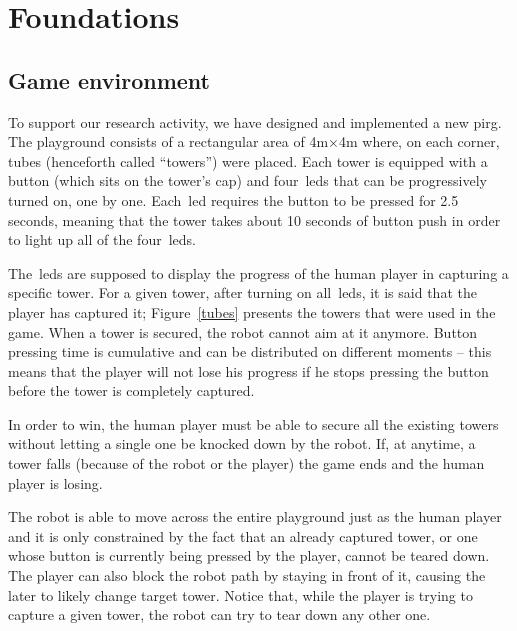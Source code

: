 \chapter{Foundations}\label{ch:foundation}

\section{Game environment}\label{sec:game_environment}
To support our research activity, we have designed and implemented a new \gls{pirg}. 
\\
The playground consists of a rectangular area of 4m$\times$4m where, on each corner, tubes (henceforth called ``towers'') were placed. Each tower is equipped with a button (which sits on the tower's cap) and four~\gls{led}s that can be progressively turned on, one by one.  Each~\gls{led} requires the button to be pressed for 2.5 seconds, meaning that the tower takes about 10 seconds of button push in order to light up all of the four~\gls{led}s.

The~\gls{led}s are supposed to display the progress of the human player in capturing a specific tower. For a given tower, after turning on all~\gls{led}s, it is said that the player has captured it; Figure~\ref{tubes} presents the towers that were used in the game. When a tower is secured, the robot cannot aim at it anymore.
Button pressing time is cumulative and can be distributed on different moments -- this means that the player will not lose his progress if he stops pressing the button before the tower is completely captured. 

In order to win, the human player must be able to secure all the existing towers without letting a single one be knocked down by the robot. If, at anytime, a tower falls (because of the robot or the player) the game ends and the human player is losing. 

The robot is able to move across the entire playground just as the human player and it is only constrained by the fact that an already captured tower, or one whose button is currently being pressed by the player, cannot be teared down. The player can also block the robot path by staying in front of it, causing the later to likely change target tower. Notice that, while the player is trying to capture a given tower, the robot can try to tear down any other one.

